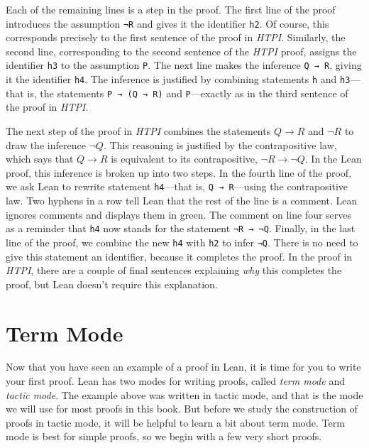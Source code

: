 \documentclass[
  letterpaper,
  DIV=11,
  numbers=noendperiod]{scrreprt}
\theoremstyle{remark}
\begin{document}
Each of the remaining lines is a step in the proof. The first line of
the proof introduces the assumption \texttt{¬R} and gives it the
identifier \texttt{h2}. Of course, this corresponds precisely to the
first sentence of the proof in \emph{HTPI}. Similarly, the second line,
corresponding to the second sentence of the \emph{HTPI} proof, assigns
the identifier \texttt{h3} to the assumption \texttt{P}. The next line
makes the inference \texttt{Q\ →\ R}, giving it the identifier
\texttt{h4}. The inference is justified by combining statements
\texttt{h} and \texttt{h3}---that is, the statements
\texttt{P\ →\ (Q\ →\ R)} and \texttt{P}---exactly as in the third
sentence of the proof in \emph{HTPI}.

The next step of the proof in \emph{HTPI} combines the statements
\(Q \to R\) and \(\neg R\) to draw the inference \(\neg Q\). This
reasoning is justified by the contrapositive law, which says that
\(Q \to R\) is equivalent to its contrapositive, \(\neg R \to \neg Q\).
In the Lean proof, this inference is broken up into two steps. In the
fourth line of the proof, we ask Lean to rewrite statement
\texttt{h4}---that is, \texttt{Q\ →\ R}---using the contrapositive law.
Two hyphens in a row tell Lean that the rest of the line is a comment.
Lean ignores comments and displays them in green. The comment on line
four serves as a reminder that \texttt{h4} now stands for the statement
\texttt{¬R\ →\ ¬Q}. Finally, in the last line of the proof, we combine
the new \texttt{h4} with \texttt{h2} to infer \texttt{¬Q}. There is no
need to give this statement an identifier, because it completes the
proof. In the proof in \emph{HTPI}, there are a couple of final
sentences explaining \emph{why} this completes the proof, but Lean
doesn't require this explanation.

\hypertarget{term-mode}{%
\section*{Term Mode}\label{term-mode}}

Now that you have seen an example of a proof in Lean, it is time for you
to write your first proof. Lean has two modes for writing proofs, called
\emph{term mode} and \emph{tactic mode}. The example above was written
in tactic mode, and that is the mode we will use for most proofs in this
book. But before we study the construction of proofs in tactic mode, it
will be helpful to learn a bit about term mode. Term mode is best for
simple proofs, so we begin with a few very short proofs.
\end{document}
